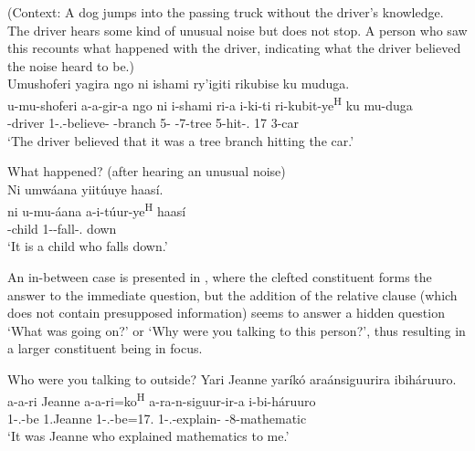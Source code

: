 \documentclass[output=paper]{langscibook}
\begin{document}
\ea
(Context: A dog jumps into the passing truck without the driver’s knowledge. The driver hears some kind of unusual noise but does not stop. A person who saw this recounts what happened with the driver, indicating what the driver believed the noise heard to be.)\\
Umushoferi yagira ngo ni ishami ry’igiti rikubise ku muduga.\\
\gll
u-mu-shoferi  a-a-gir-a  ngo  ni  i-shami  ri-a   i-ki-ti  ri-kubit-ye\textsuperscript{H}  ku  mu-duga \\
-{}driver  1\SM-\N.\PST{}-believe-\FV{}  \QUOT{}  \COP{}  \AUG{}-branch  5-\CONN{}   \AUG{}-7-tree  5\SM-{}hit-\PFV.\REL{}  17  3-car \\
\glt
  ‘The driver believed that it was a tree branch hitting the car.’\\

\z

\ea
\begin{xlist}
  What happened? (after hearing an unusual noise)\\
Ni umwáana yiitúuye haasí.\\
\gll
ni   u-mu-áana  a-i-túur-ye\textsuperscript{H}  haasí\\
\COP{}  -child  1\SM-\REFL{}-fall-\PFV.\REL{}  down\\
\glt
‘It is a child who falls down.’\\

\end{xlist}
\z

An in-between case is presented in , where the clefted constituent forms the answer to the immediate question, but the addition of the relative clause (which does not contain presupposed information) seems to answer a hidden question ‘What was going on?’ or ‘Why were you talking to this person?’, thus resulting in a larger constituent being in focus.

\ea
\label{bkm:Ref75343434}
\begin{xlist}
  Who were you talking to outside?
Yari Jeanne yaríkó araánsiguurira ibiháruuro.\\
\gll
a-a-ri  Jeanne  a-a-ri=ko\textsuperscript{H}  a-ra-n-siguur-ir-a i-bi-háruuro \\
1\SM-\N.\PST{}-be  1.Jeanne  1\SM-\N.\PST{}-be=17.\REL{}  1\SM-\SG.\OM{}-explain-\FV{}   \AUG{}-8-mathematic \\
\glt
  ‘It was Jeanne who explained mathematics to me.’\\

\end{xlist}
\z
\end{document}
